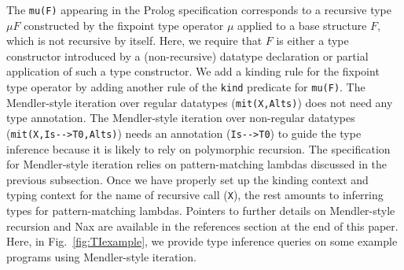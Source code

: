 \documentclass[runningheads,a4paper]{llncs}
\begin{document}
The \verb|mu(F)| appearing in the Prolog specification corresponds to
a recursive type $\mu F$ constructed by the fixpoint type operator $\mu$
applied to a base structure $F$, which is not recursive by itself.
Here, we require that $F$ is either a type constructor introduced by
a (non-recursive) datatype declaration or partial application of
such a type constructor. We add a kinding rule for the fixpoint type operator
by adding another rule of the \verb|kind| predicate for \verb|mu(F)|.
The Mendler-style iteration over regular datatypes (\verb|mit(X,Alts)|)
does not need any type annotation. The Mendler-style iteration over
non-regular datatypes (\verb|mit(X,Is-->T0,Alts)|) needs an annotation
(\verb|Is-->T0|) to guide the type inference because it is likely to rely on
polymorphic recursion. The specification for Mendler-style iteration relies
on pattern-matching lambdas discussed in the previous subsection. Once we have
properly set up the kinding context and typing context for the name of
recursive call (\verb|X|), the rest amounts to inferring types for
pattern-matching lambdas. Pointers to further details on Mendler-style
recursion \cite{vene00phd,AbeMatUus03,AhnShe11} and Nax \cite{Ahn14thesis}
are available in the references section at the end of this paper.
Here, in Fig.~\ref{fig:TIexample}, we provide type inference queries on
some example programs using Mendler-style iteration.
\end{document}
